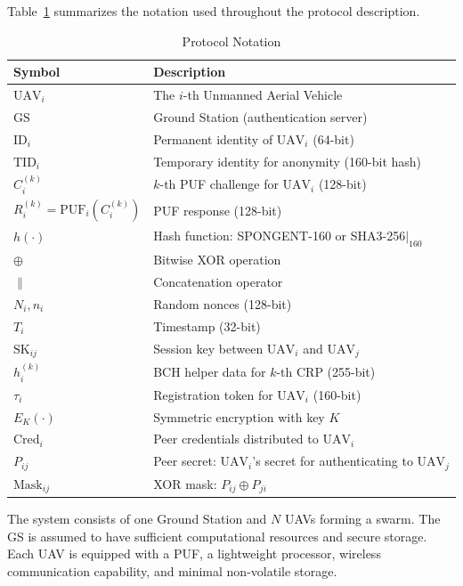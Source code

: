 \documentclass[11pt,a4paper]{article}
\begin{document}
Table~\ref{tab:notation} summarizes the notation used throughout the protocol description.

\begin{table}[H]
\centering
\caption{Protocol Notation}
\label{tab:notation}
\begin{tabular}{@{}ll@{}}
\toprule
\textbf{Symbol} & \textbf{Description} \\
\midrule
$\text{UAV}_i$ & The $i$-th Unmanned Aerial Vehicle \\
$\text{GS}$ & Ground Station (authentication server) \\
$\text{ID}_i$ & Permanent identity of $\text{UAV}_i$ (64-bit) \\
$\text{TID}_i$ & Temporary identity for anonymity (160-bit hash) \\
$C_i^{(k)}$ & $k$-th PUF challenge for $\text{UAV}_i$ (128-bit) \\
$R_i^{(k)} = \text{PUF}_i(C_i^{(k)})$ & PUF response (128-bit) \\
$h(\cdot)$ & Hash function: SPONGENT-160 or SHA3-256$|_{160}$ \\
$\oplus$ & Bitwise XOR operation \\
$\|$ & Concatenation operator \\
$N_i, n_i$ & Random nonces (128-bit) \\
$T_i$ & Timestamp (32-bit) \\
$\text{SK}_{ij}$ & Session key between $\text{UAV}_i$ and $\text{UAV}_j$ \\
$h_i^{(k)}$ & BCH helper data for $k$-th CRP (255-bit) \\
$\tau_i$ & Registration token for $\text{UAV}_i$ (160-bit) \\
$E_K(\cdot)$ & Symmetric encryption with key $K$ \\
$\text{Cred}_i$ & Peer credentials distributed to $\text{UAV}_i$ \\
$P_{ij}$ & Peer secret: $\text{UAV}_i$'s secret for authenticating to $\text{UAV}_j$ \\
$\text{Mask}_{ij}$ & XOR mask: $P_{ij} \oplus P_{ji}$ \\
\bottomrule
\end{tabular}
\end{table}

The system consists of one Ground Station and $N$ UAVs forming a swarm. The GS is assumed to have sufficient computational resources and secure storage. Each UAV is equipped with a PUF, a lightweight processor, wireless communication capability, and minimal non-volatile storage.
\end{document}
